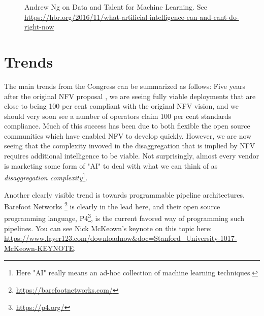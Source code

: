 \documentclass[11pt, oneside]{article}   	%
\begin{document}
\begin{figure}
\caption{Andrew Ng on Data and Talent for Machine Learning. See \\
\url{https://hbr.org/2016/11/what-artificial-intelligence-can-and-cant-do-right-now}}
\label{fig:talent_and_data}
\end{figure}

\section{Trends} 
\label{sec:trends}
The main trends from the Congress can be summarized as follows: Five years after the original NFV proposal \cite{nfv}, we are seeing fully viable deployments that are close to being 100 per cent compliant with the original NFV vision, and we should very soon see a number of operators claim 100 per cent standards compliance. Much of this success has been due to both flexible the open source communities which have enabled NFV to develop quickly. However, we are now seeing that the complexity invoved in the disaggregation that is implied by NFV requires additional intelligence to be viable. Not surprisingly, almost every vendor is marketing some form of "AI" to deal with what we can think of as \emph{disaggregation complexity}\footnote{Here "AI" really means an ad-hoc collection of machine learning techniques.}.

\bigskip
\noindent
Another clearly visible trend is towards programmable pipeline architectures. Barefoot Networks \footnote{\url{https://barefootnetworks.com/}} is clearly in the lead here, and their open source programming language, P4\footnote{\url{https://p4.org/}}, is the current favored way of programming such pipelines. You can see Nick McKeown's keynote on this topic here: \url{ https://www.layer123.com/downloadnow&doc=Stanford_University-1017-McKeown-KEYNOTE}.
\end{document}
